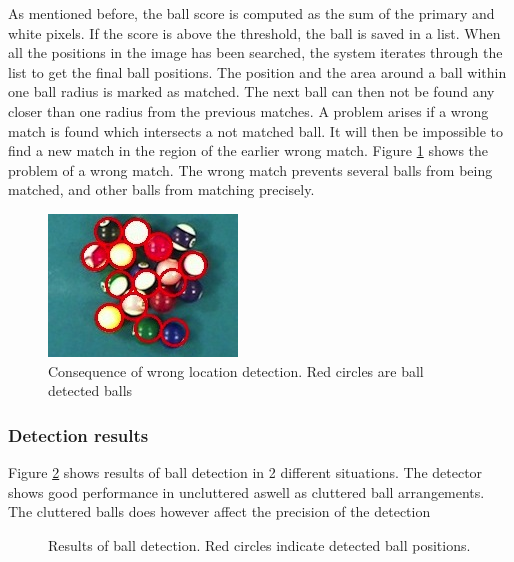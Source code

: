 As mentioned before, the ball score is computed as the sum of the primary and white pixels. If the score is above the threshold, the ball is saved in a list. When all the positions in the image has been searched, the system iterates through the list to get the final ball positions. The position and the area around  a ball within one ball radius is marked as matched. The next ball can then not be found any closer than one radius from the previous matches. A problem arises if a wrong match is found which intersects a not matched ball. It will then be impossible to find a new match in the region of the earlier wrong match.
Figure \ref{fig:wronglocate} shows the problem of a wrong match. The wrong match prevents several balls from being matched, and other balls from matching precisely.
\begin{figure}[h]
\begin{center}
\includegraphics{images/wronglocate.jpg}
\caption{Consequence of wrong location detection. Red circles are ball detected balls}
\label{fig:wronglocate}
\end{center}
\end{figure}

\subsubsection{Detection results}
Figure \ref{fig:detect} shows results of ball detection in 2 different situations. The detector shows good performance in uncluttered aswell as cluttered ball arrangements. The cluttered balls does however affect the precision of the detection

\begin{figure}[h]
  \centering
  \quad           
   \caption{Results of ball detection. Red circles indicate detected ball positions.}
  \label{fig:detect}
\end{figure}

